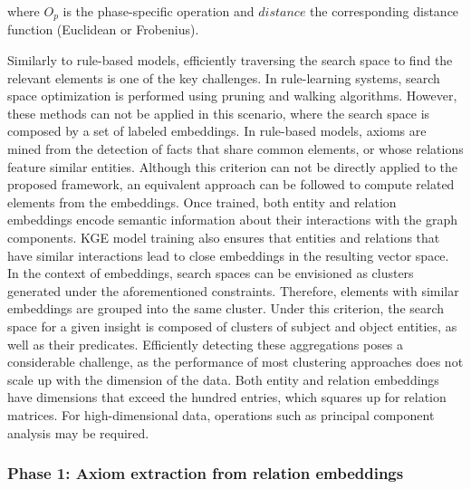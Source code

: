 where $O_p$ is the phase-specific operation and $distance$ the corresponding distance function (Euclidean or Frobenius). 

Similarly to rule-based models, efficiently traversing the search space to find the relevant elements is one of the key challenges. In rule-learning systems, search space optimization is performed using pruning and walking algorithms. However, these methods can not be applied in this scenario, where the search space is composed by a set of labeled embeddings. In rule-based models, axioms are mined from the detection of facts that share common elements, or whose relations feature similar entities. Although this criterion can not be directly applied to the proposed framework, an equivalent approach can be followed to compute related elements from the embeddings. Once trained, both entity and relation embeddings encode semantic information about their interactions with the graph components. KGE model training also ensures that entities and relations that have similar interactions lead to close embeddings in the resulting vector space. 
In the context of embeddings, search spaces can be envisioned as clusters generated under the aforementioned constraints. Therefore, elements with similar embeddings are grouped into the same cluster. Under this criterion, the search space for a given insight is composed of clusters of subject and object entities, as well as their predicates. Efficiently detecting these aggregations poses a considerable challenge, as the performance of most clustering approaches does not scale up with the dimension of the data. Both entity and relation embeddings have dimensions that exceed the hundred entries, which squares up for relation matrices. For high-dimensional data, operations such as principal component analysis may be required.

\subsubsection*{Phase 1: Axiom extraction from relation embeddings}

